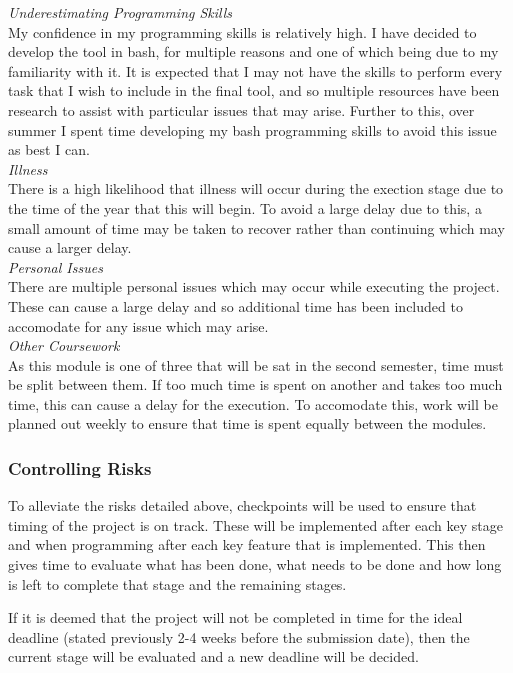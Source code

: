 \documentclass[11pt,a4paper]{article}
\begin{document}
\textit{Underestimating Programming Skills}\\
My confidence in my programming skills is relatively high. I have decided to develop the tool in bash, for multiple reasons and one of which being due to my familiarity with it. It is expected that I may not have the skills to perform every task that I wish to include in the final tool, and so multiple resources have been research to assist with particular issues that may arise. Further to this, over summer I spent time developing my bash programming skills to avoid this issue as best I can.\\

\textit{Illness}\\
There is a high likelihood that illness will occur during the exection stage due to the time of the year that this will begin. To avoid a large delay due to this, a small amount of time may be taken to recover rather than continuing which may cause a larger delay.\\

\textit{Personal Issues}\\
There are multiple personal issues which may occur while executing the project. These can cause a large delay and so additional time has been included to accomodate for any issue which may arise.\\

\textit{Other Coursework}\\
As this module is one of three that will be sat in the second semester, time must be split between them. If too much time is spent on another and takes too much time, this can cause a delay for the execution. To accomodate this, work will be planned out weekly to ensure that time is spent equally between the modules.\\

\subsubsection{Controlling Risks}

To alleviate the risks detailed above, checkpoints will be used to ensure that timing of the project is on track. These will be implemented after each key stage and when programming after each key feature that is implemented. This then gives time to evaluate what has been done, what needs to be done and how long is left to complete that stage and the remaining stages.

If it is deemed that the project will not be completed in time for the ideal deadline (stated previously 2-4 weeks before the submission date), then the current stage will be evaluated and a new deadline will be decided. 




\end{document}
